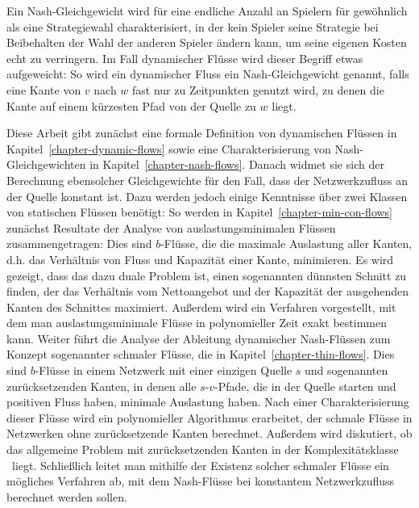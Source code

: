 Ein Nash-Gleichgewicht wird für eine endliche Anzahl an Spielern für gewöhnlich als eine Strategiewahl charakterisiert, in der kein Spieler seine Strategie bei Beibehalten der Wahl der anderen Spieler ändern kann, um seine eigenen Kosten echt zu verringern.
Im Fall dynamischer Flüsse wird dieser Begriff etwas aufgeweicht:
So wird ein dynamischer Fluss ein Nash-Gleichgewicht genannt, falls eine Kante von $v$ nach $w$
fast nur zu Zeitpunkten genutzt wird, zu denen die Kante auf einem kürzesten  Pfad von der Quelle zu $w$ liegt.

Diese Arbeit gibt zunächst eine formale Definition von dynamischen Flüssen in Kapitel~\ref{chapter-dynamic-flows} sowie eine Charakterisierung von Nash-Gleichgewichten in Kapitel~\ref{chapter-nash-flows}.
Danach widmet sie sich der Berechnung ebensolcher Gleichgewichte für den Fall, dass der Netzwerkzufluss an der Quelle konstant ist.
Dazu werden jedoch einige Kenntnisse über zwei Klassen von statischen Flüssen benötigt:
So werden in Kapitel~\ref{chapter-min-con-flows} zunächst Resultate der Analyse von auslastungsminimalen Flüssen zusammengetragen:
Dies sind $b$-Flüsse, die die maximale Auslastung aller Kanten, d.h. das Verhältnis von Fluss und Kapazität einer Kante, minimieren.
Es wird gezeigt, dass das dazu duale Problem ist, einen sogenannten dünnsten Schnitt zu finden, der das Verhältnis vom Nettoangebot und der Kapazität der ausgehenden Kanten des Schnittes maximiert.
Außerdem wird ein Verfahren vorgestellt, mit dem man auslastungsminimale Flüsse in polynomieller Zeit exakt bestimmen kann.
Weiter führt die Analyse der Ableitung dynamischer Nash-Flüssen zum Konzept sogenannter schmaler Flüsse, die in Kapitel~\ref{chapter-thin-flows}.
Dies sind $b$-Flüsse in einem Netzwerk mit einer einzigen Quelle $s$ und sogenannten zurücksetzenden Kanten, in denen alle $s$-$v$-Pfade, die in der Quelle starten und positiven Fluss haben, minimale Auslastung haben.
Nach einer Charakterisierung dieser Flüsse wird ein polynomieller Algorithmus erarbeitet, der schmale Flüsse in Netzwerken ohne zurücksetzende Kanten berechnet.
Außerdem wird diskutiert, ob das allgemeine Problem mit zurücksetzenden Kanten in der Komplexitätsklasse \PPAD\ liegt.
Schließlich leitet man mithilfe der Existenz solcher schmaler Flüsse ein mögliches Verfahren ab, mit dem Nash-Flüsse bei konstantem Netzwerkzufluss berechnet werden sollen.
